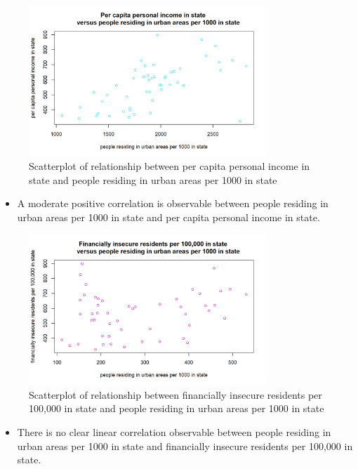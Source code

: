 \documentclass[12pt,letterpaper]{article}
\begin{document}
\newpage

\begin{figure}[H]
	\caption{Scatterplot of relationship between per capita personal income in state and people residing in urban areas per 1000 in state}
	\centering
	\includegraphics[width=0.8\textwidth]{Figure_1_5.png}
\end{figure}

\begin{itemize}
	\item 
A moderate positive correlation is observable between people residing in urban areas per 1000 in state and per capita personal income in state. 
\end{itemize}

\newpage

\begin{figure}[H]
	\caption{Scatterplot of relationship between financially insecure residents per 100,000 in state and people residing in urban areas per 1000 in state}
	\centering
	\includegraphics[width=0.8\textwidth]{Figure_1_6.png}
\end{figure}

\begin{itemize}
	\item 
There is no clear linear correlation observable between people residing in urban areas per 1000 in state and financially insecure residents per 100,000 in state.
\end{itemize}
\end{document}
